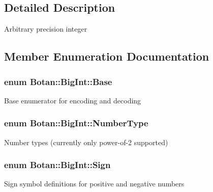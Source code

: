 \subsection{Detailed Description}
Arbitrary precision integer 

\subsection{Member Enumeration Documentation}
\hypertarget{classBotan_1_1BigInt_a2f432a3a957f2e25c78af361ab662a23}{
\subsubsection[{Base}]{\setlength{\rightskip}{0pt plus 5cm}enum {\bf Botan\-::\-Big\-Int\-::\-Base}}}\label{classBotan_1_1BigInt_a2f432a3a957f2e25c78af361ab662a23}
Base enumerator for encoding and decoding \hypertarget{classBotan_1_1BigInt_a04e15539ce23aadc724b1be759873341}{
\subsubsection[{Number\-Type}]{\setlength{\rightskip}{0pt plus 5cm}enum {\bf Botan\-::\-Big\-Int\-::\-Number\-Type}}}\label{classBotan_1_1BigInt_a04e15539ce23aadc724b1be759873341}
Number types (currently only power-\/of-\/2 supported) \hypertarget{classBotan_1_1BigInt_ad4cc39c2c247db669ac07e5501dbf84d}{
\subsubsection[{Sign}]{\setlength{\rightskip}{0pt plus 5cm}enum {\bf Botan\-::\-Big\-Int\-::\-Sign}}}\label{classBotan_1_1BigInt_ad4cc39c2c247db669ac07e5501dbf84d}
Sign symbol definitions for positive and negative numbers 

